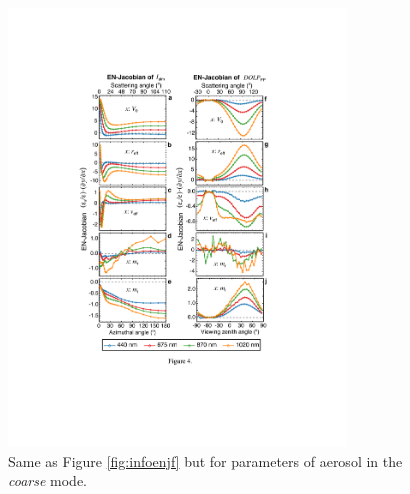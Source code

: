 \begin{figure}[p]
  \centering
  \includegraphics[width={0.8\textwidth}]{figures/info04.pdf}
  \caption{Same as Figure \ref{fig:infoenjf} but for parameters of aerosol in 
the \textit{coarse} mode.}
  \label{fig:infoenjc}
\end{figure}

